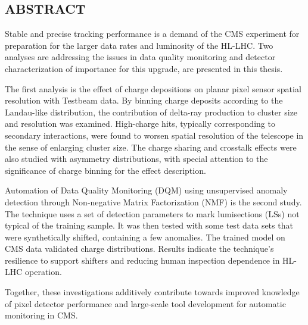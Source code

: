 



\vspace*{0.5in}
\begin{center}
	\section*{ABSTRACT}
\end{center}

\noindent

Stable and precise tracking performance is a demand of the CMS experiment for preparation for the larger data rates and luminosity of the HL-LHC. Two analyses are addressing the issues in data quality monitoring and detector characterization of importance for this upgrade, are presented in this thesis.

The first analysis is the effect of charge depositions on planar pixel sensor spatial resolution with Testbeam data. By binning charge deposits according to the Landau-like distribution, the contribution of delta-ray production to cluster size and resolution was examined. High-charge hits, typically corresponding to secondary interactions, were found to worsen spatial resolution of the telescope in the sense of enlarging cluster size. The charge sharing and crosstalk effects were also studied with asymmetry distributions, with special attention to the significance of charge binning for the effect description.

Automation of Data Quality Monitoring (DQM) using unsupervised anomaly detection through Non-negative Matrix Factorization (NMF) is the second study. The technique uses a set of detection parameters to mark lumisections (LSs) not typical of the training sample. It was then tested with some test data sets that were synthetically shifted, containing a few anomalies. The trained model on CMS data validated charge distributions. Results indicate the technique's resilience to support shifters and reducing human inspection dependence in HL-LHC operation.

Together, these investigations additively contribute towards improved knowledge of pixel detector performance and large-scale tool development for automatic monitoring in CMS.









